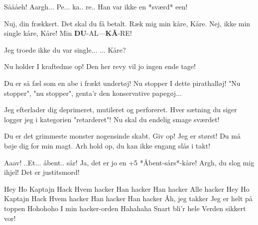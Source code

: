 \documentclass[a4paper,11pt]{article}
\begin{document}
\begin{song}
 Såååeh! 
 Aargh... Pe... ka.. re.. 
 Han var ikke en *sværd* een!

 Nuj, din frækkert. Det skal du få betalt. Ræk mig min kåre, Kåre.
 
 Nej, ikke min single kåre, Kåre! Min \textbf{D}\textbf{U}-AL---\textbf{K}\textbf{Å}-RE!

%

 Jeg troede ikke du var single... ... Kåre?


 
	Nu holder I kraftedme op! Den her revy vil jo ingen ende tage!

%

%
 Du er så fæl som en abe i frækt undertøj!
 Nu stopper I dette pirathalløj!
 "Nu stopper", "nu stopper", genta'r den konservative papegøj...

 Jeg efterlader dig deprimeret, mutileret og perforeret.
 Hver sætning du siger logger jeg i kategorien "retarderet"!
 Nu skal du endelig smage sværdet!

 Du er det grimmeste monster nogensinde skabt.
 Giv op! Jeg er størst! Du må bøje dig for min magt.
 Arh hold op, du kan ikke engang slås i takt!

%

%

%
 Aaav! ..Et... åbent.. sår!
 Ja, det er jo en +5 *Åbent-sårs*-kåre!
 Argh, du slog mig ihjel! Det er justitsmord! 

%

%
 Hey Ho Kaptajn Hack
 Hvem hacker
 Han hacker 
 Han hacker 
 Alle hacker
 Hey Ho Kaptajn Hack
 Hvem hacker
 Han hacker 
 Han hacker 
 Åh, jeg takker
	Jeg er helt på toppen
 Hohohoho
 I min hacker-orden
 Hahahaha
 Snart bli'r hele Verden sikkert vor!


\end{song}
\end{document}
